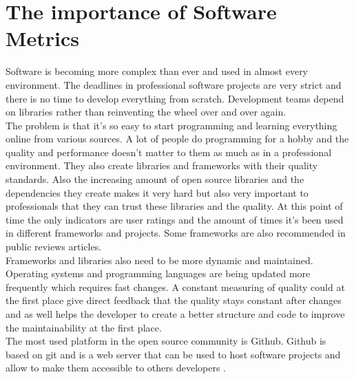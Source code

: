 \section{The importance of Software Metrics}
Software is becoming more complex than ever and used in almost every environment. The deadlines in professional software projects are very strict and there is no time to develop everything from scratch. Development teams depend on libraries rather than reinventing the wheel over and over again. \\
The problem is that it's so easy to start programming and learning everything online from various sources. A lot of people do programming for a hobby and the quality and performance doesn't matter to them as much as in a professional environment. They also create libraries and frameworks with their quality standards. Also the increasing amount of open source libraries and the dependencies they create makes it very hard but also very important to professionals that they can trust these libraries and the quality. At this point of time the only indicators are user ratings and the amount of times it's been used in different frameworks and projects. Some frameworks are also recommended in public reviews articles. \\
Frameworks and libraries also need to be more dynamic and maintained. Operating systems and programming languages are being updated more frequently which requires fast changes. A constant measuring of quality could at the first place give direct feedback that the quality stays constant after changes and as well helps the developer to create a better structure and code to improve the maintainability at the first place. \\
The most used platform in the open source community is Github. Github is based on git and is a web server that can be used to host software projects and allow to make them accessible to others developers  \cite{dabbish2012social}.